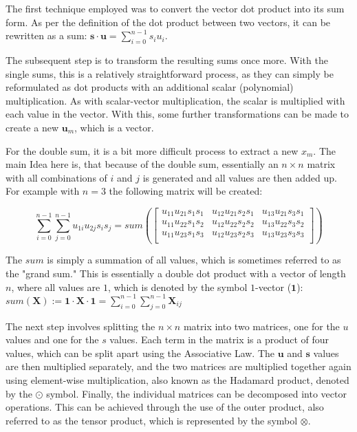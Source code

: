 The first technique employed was to convert the vector dot product into its sum form. As per the definition of the dot product between two vectors, it can be rewritten as a sum: $\textbf{s}\cdot \textbf{u} = \sum_{i=0}^{n-1}s_iu_i$.

The subsequent step is to transform the resulting sums once more. With the single sums, this is a relatively straightforward process, as they can simply be reformulated as dot products with an additional scalar (polynomial) multiplication. As with scalar-vector multiplication, the scalar is multiplied with each value in the vector. With this, some further transformations can be made to create a new $\textbf{u}_m$, which is a vector. 

For the double sum, it is a bit more difficult process to extract a new $x_m$. The main Idea here is, that because of the double sum, essentially an $n\times n$ matrix with all combinations of $i$ and $j$ is generated and all values are then added up. For example with $n=3$ the following matrix will be created:

$$
  \sum_{i=0}^{n-1}\sum_{j=0}^{n-1}u_{1i}u_{2j}s_is_j = sum\left(\begin{bmatrix}
      u_{11}u_{21}s_{1}s_{1} & u_{12}u_{21}s_{2}s_{1} & u_{13}u_{21}s_{3}s_{1} \\
      u_{11}u_{22}s_{1}s_{2} & u_{12}u_{22}s_{2}s_{2} & u_{13}u_{22}s_{3}s_{2} \\
      u_{11}u_{23}s_{1}s_{3} & u_{12}u_{23}s_{2}s_{3} & u_{13}u_{23}s_{3}s_{3} \\
    \end{bmatrix}\right)
$$

The $sum$ is simply a summation of all values, which is sometimes referred to as the "grand sum." This is essentially a double dot product with a vector of length $n$, where all values are $1$, which is denoted by the symbol $1$-vector ($\textbf{1}$): $sum(\textbf{X}):= \textbf{1}\cdot \textbf{X} \cdot \textbf{1} = \sum_{i=0}^{n-1}\sum_{j=0}^{n-1} \textbf{X}_{ij}$

The next step involves splitting the $n \times n$ matrix into two matrices, one for the $u$ values and one for the $s$ values. Each term in the matrix is a product of four values, which can be split apart using the Associative Law. The $\textbf{u}$ and $\textbf{s}$ values are then multiplied separately, and the two matrices are multiplied together again using element-wise multiplication, also known as the Hadamard product, denoted by the $\odot$ symbol. Finally, the individual matrices can be decomposed into vector operations. This can be achieved through the use of the outer product, also referred to as the tensor product, which is represented by the symbol $\otimes$.


